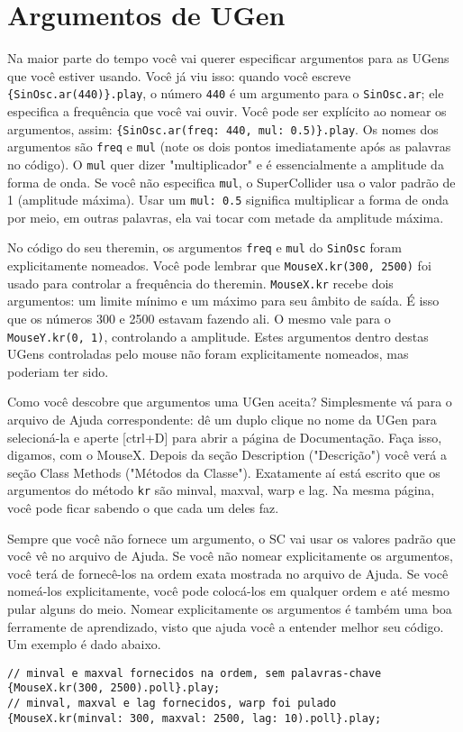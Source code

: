 \section{Argumentos de UGen}

Na maior parte do tempo você vai querer especificar argumentos para as UGens que você estiver usando. Você já viu isso: quando você escreve \texttt{\{SinOsc.ar(440)\}.play}, o número \texttt{440} é um argumento para o \texttt{SinOsc.ar}; ele especifica a frequência que você vai ouvir. Você pode ser explícito ao nomear os argumentos, assim: \texttt{\{SinOsc.ar(freq: 440, mul: 0.5)\}.play}. Os nomes dos argumentos são \texttt{freq} e \texttt{mul} (note os dois pontos imediatamente após as palavras no código). O \texttt{mul} quer dizer "multiplicador" e é essencialmente a amplitude da forma de onda. Se você não especifica \texttt{mul}, o SuperCollider usa o valor padrão de 1 (amplitude máxima). Usar um \texttt{mul: 0.5} significa multiplicar a forma de onda por meio, em outras palavras, ela vai tocar com metade da amplitude máxima.

No código do seu theremin, os argumentos \texttt{freq} e \texttt{mul} do \texttt{SinOsc} foram explicitamente nomeados. Você pode lembrar que \texttt{MouseX.kr(300, 2500)} foi usado para controlar a frequência do theremin. \texttt{MouseX.kr} recebe dois argumentos: um limite mínimo e um máximo para seu âmbito de saída. É isso que os números 300 e 2500 estavam fazendo ali. O mesmo vale para o \texttt{MouseY.kr(0, 1)}, controlando a amplitude. Estes argumentos dentro destas UGens controladas pelo mouse não foram explicitamente nomeados, mas poderiam ter sido.

Como você descobre que argumentos uma UGen aceita? Simplesmente vá para o arquivo de Ajuda correspondente: dê um duplo clique no nome da UGen para selecioná-la e aperte [ctrl+D] para abrir a página de Documentação. Faça isso, digamos, com o MouseX. Depois da seção Description ("Descrição") você verá a seção Class Methods ("Métodos da Classe"). Exatamente aí está escrito que os argumentos do método \texttt{kr} são minval, maxval, warp e lag. Na mesma página, você pode ficar sabendo o que cada um deles faz.

Sempre que você não fornece um argumento, o SC vai usar os valores padrão que você vê no arquivo de Ajuda. Se você não nomear explicitamente os argumentos, você terá de fornecê-los na ordem exata mostrada no arquivo de Ajuda. Se você nomeá-los explicitamente, você pode colocá-los em qualquer ordem e até mesmo pular alguns do meio. Nomear explicitamente os argumentos é também uma boa ferramente de aprendizado, visto que ajuda você a entender melhor seu código. Um exemplo é dado abaixo.

\begin{lstlisting}[style=SuperCollider-IDE, basicstyle=\scttfamily\footnotesize]
// minval e maxval fornecidos na ordem, sem palavras-chave
{MouseX.kr(300, 2500).poll}.play;
// minval, maxval e lag fornecidos, warp foi pulado
{MouseX.kr(minval: 300, maxval: 2500, lag: 10).poll}.play;
\end{lstlisting}
